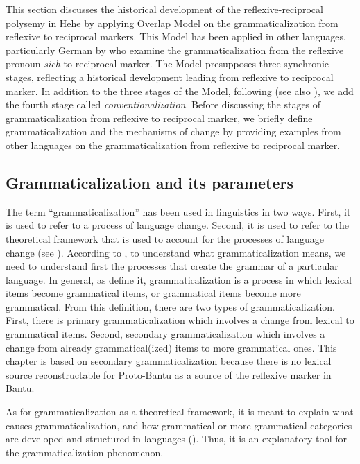 \documentclass[output=paper,
            colorlinks, citecolor=brown
            ,draftmode
		  ]{langscibook}
\begin{document}
This section discusses the historical development of the reflexive-reciprocal polysemy in Hehe by applying  Overlap Model on the grammaticalization from reflexive to reciprocal markers. This Model has been applied in other languages, particularly German by \citet{HeineMiyashita2008, HeineNarrog2009} who examine the grammaticalization from the reflexive pronoun \textit{sich} to reciprocal marker. The Model presupposes three synchronic stages, reflecting a historical development leading from reflexive to reciprocal marker. In addition to the three stages of the Model, following \citet{Heine2002} (see also \citealt{HeineKuteva2007}), we add the fourth stage called \textit{conventionalization}. Before discussing the stages of grammaticalization from reflexive to reciprocal marker, we briefly define grammaticalization and the mechanisms of change by providing examples from other languages on the grammaticalization from reflexive to reciprocal marker.

\subsection{Grammaticalization and its parameters}\label{sec:ngwasi:3.1}

The term ``grammaticalization'' has been used in linguistics in two ways. First, it is used to refer to a process of language change. Second, it is used to refer to the theoretical framework that is used to account for the processes of language change (see \citealt{CampbellJanda2001, Heine2003, HeineNarrog2009}). According to \citet{Croft2006}, to understand what grammaticalization means, we need to understand first the processes that create the grammar of a particular language.  In general, as \citet{HeineNarrog2009} define it, grammaticalization is a process in which lexical items become grammatical items, or grammatical items become more grammatical. From this definition, there are two types of grammaticalization. First, there is primary grammaticalization which involves a change from lexical to grammatical items. Second, secondary grammaticalization which involves a change from already grammatical(ized) items to more grammatical ones. This chapter is based on secondary grammaticalization because there is no lexical source reconstructable for Proto-Bantu as a source of the reflexive marker in Bantu. 

As for grammaticalization as a theoretical framework, it is meant to explain what causes grammaticalization, and how grammatical or more grammatical categories are developed and structured in languages (\citealt{Heine2003, HeineKuteva2007}). Thus, it is an explanatory tool for the grammaticalization phenomenon. 
\end{document}
